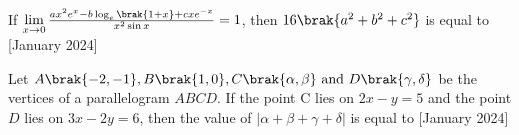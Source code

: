     \bigskip
    \item If $\lim \limits_{x\to 0} \frac{ax^2e^x-b\log_{e}{\brak{1+x}}+cxe^{-x}}{x^2\sin{x}}=1$, then $16\brak{a^2+b^2+c^2}$ is equal to \hfill{[January 2024]}
    \bigskip
    \item Let $A\brak{-2,-1},B\brak{1,0},C\brak{\alpha,\beta}\text{ and }D\brak{\gamma,\delta}$ be the vertices of a parallelogram $ABCD$. If the point C lies on $2x-y=5$ and the point $D$ lies on $3x-2y=6$, then the value of $|\alpha + \beta +\gamma +\delta|$ is equal to \hfill{[January 2024]}
 
